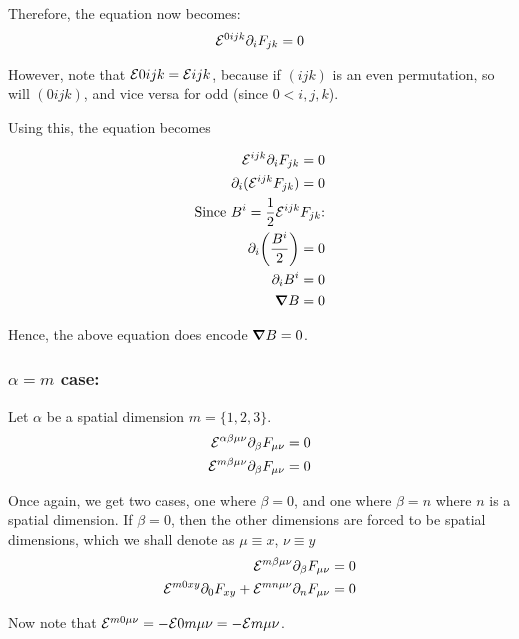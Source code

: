 Therefore, the equation now becomes:
\begin{align*}
    \mathcal{E}^{0 i j k}  \partial_{i} F_{j k} = 0
\end{align*}

However, note that $\mathcal{E}{0 i j k} = \mathcal{E}{i j k}$, because if
$(i j k)$ is an even permutation, so will $(0 i j k)$, and vice versa for odd
(since $0 < i, j, k$).

Using this, the equation becomes

\begin{align*}
    \mathcal{E}^{i j k}  \partial_{i} F_{j k} = 0 \\
    \partial_{i} ( \mathcal{E}^{i j k} F_{j k}) = 0 \\
    \text{Since $B^i = \frac{1}{2} \mathcal{E}^{ijk} F_{j k}$:} \\
    \partial_{i} \bigg( \frac{B^i}{2} \bigg) = 0 \\
    \partial_{i}  B^i = 0 \\
    \grad B = 0
\end{align*}

Hence, the above equation does encode $\grad B = 0$.

\subsubsection{$\alpha = m$ case:}
Let $\alpha$ be a spatial dimension $m = \{ 1, 2, 3 \}$.
\begin{align*}
    \mathcal{E}^{\alpha \beta \mu \nu}  \partial_{\beta} F_{\mu \nu} = 0 \\
    \mathcal{E}^{m \beta \mu \nu}  \partial_{\beta} F_{\mu \nu} = 0
\end{align*}

Once again, we get two cases, one where $\beta = 0$, and one where $\beta = n$
where $n$ is a spatial dimension. If $\beta = 0$, then the other dimensions
are forced to be spatial dimensions, which we shall denote as $\mu \equiv x$,
$\nu \equiv y$
\begin{align*}
    \mathcal{E}^{m \beta \mu \nu}  \partial_{\beta} F_{\mu \nu} = 0 \\
    \mathcal{E}^{m 0 x y}  \partial_{0} F_{x y} + \mathcal{E}^{m n \mu \nu}  \partial_{n} F_{\mu \nu}  = 0 \\
\end{align*}

Now note that $\mathcal{E}^{m 0 \mu \nu} = - \mathcal{E}{0 m \mu \nu} = - \mathcal{E}{m \mu \nu}$.

